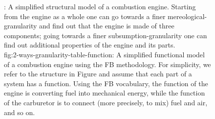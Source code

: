 \documentclass[
]{ceurart}
\begin{document}
\begin{figure}
\begin{subfigure}{0.49\textwidth}
    \caption{}
    \label{fig:2-ways-granularity-table-function}
    \end{subfigure}
\caption{: A simplified structural model of a combustion engine. Starting from the engine as a whole one can go towards a finer mereological-granularity and find out that the engine is made of three components; going towards a finer subsumption-granularity one can find out additional properties of the engine and its parts. \\ %
\subref
{fig:2-ways-granularity-table-function}: A simplified functional model of a combustion engine using the FB methodology. For simplicity, we refer to the structure in Figure  and assume that each part of a system has a function. Using the FB vocabulary, the function of the engine is converting fuel into mechanical energy, while the function of the carburetor is to connect (more precisely, to mix) fuel and air, and so on. %
}
\label{fig:due-figure}
\end{figure}



\end{document}
